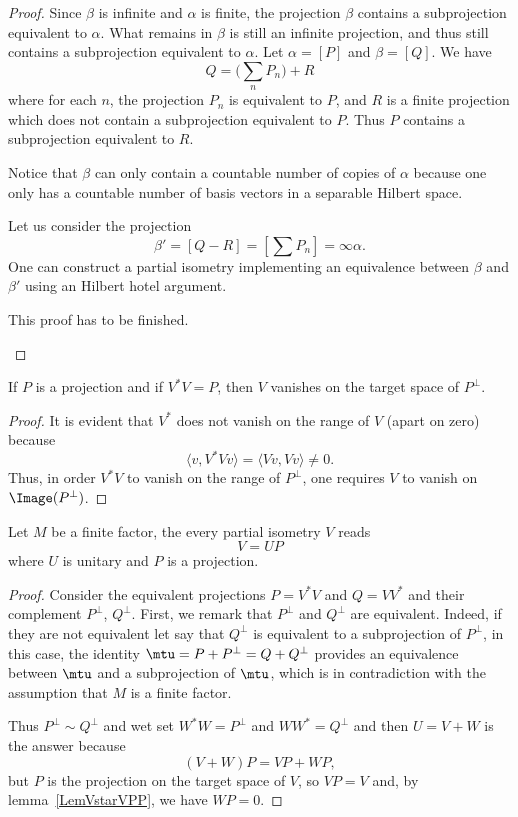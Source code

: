 \begin{proof}
Since $\beta$ is infinite and $\alpha$ is finite, the projection $\beta$ contains a subprojection equivalent to $\alpha$. What remains in $\beta$ is still an infinite projection, and thus still contains a subprojection equivalent to $\alpha$. Let $\alpha=[P]$ and $\beta=[Q]$. We have
\[
  Q=\big( \sum_nP_n \big)+R
\]
where for each $n$, the projection $P_n$ is equivalent to $P$, and $R$ is a finite projection which does not contain a subprojection equivalent to $P$. Thus $P$ contains a subprojection equivalent to $R$.

Notice that $\beta$ can only contain a countable number of copies of $\alpha$ because one only has a countable number of basis vectors in a separable Hilbert space.

Let us consider the projection
\begin{equation}
	\beta'=[Q-R]=[\sum P_n]=\infty\alpha.
\end{equation}
One can construct a partial isometry implementing an equivalence between $\beta$ and $\beta'$ using an Hilbert hotel argument.
\begin{probleme}
This proof has to be finished.
\end{probleme}
\end{proof}

\begin{lemma}	\label{LemVstarVPP}
If $P$ is a projection and if $V^*V=P$, then $V$ vanishes on the target space of $P^{\perp}$.
\end{lemma}

\begin{proof}
It is evident that $V^*$ does not vanish on the range of $V$ (apart on zero) because
\[
  \langle v, V^*Vv\rangle =\langle Vv, Vv\rangle \neq 0.
\]
Thus, in order $V^*V$ to vanish on the range of $P^{\perp}$, one requires $V$ to vanish on $\Image(P^{\perp})$.
\end{proof}

\begin{lemma}		\label{LemfinifactisemVUP}
Let $M$ be a finite factor, the every partial isometry $V$ reads
\begin{equation}
	V=UP
\end{equation}
where $U$ is unitary and $P$ is a projection.
\end{lemma}

\begin{proof}
Consider the equivalent projections $P=V^*V$ and $Q=VV^*$ and their complement $P^{\perp}$, $Q^{\perp}$. First, we remark that $P^{\perp}$ and $Q^{\perp}$ are equivalent. Indeed, if they are not equivalent let say that $Q^{\perp}$ is equivalent to a subprojection of $P^{\perp}$, in this case, the identity $\mtu=P+P^{\perp}=Q+Q^{\perp}$ provides an equivalence between $\mtu$ and a subprojection of $\mtu$, which is in contradiction with the assumption that $M$ is a finite factor.

Thus $P^{\perp}\sim Q^{\perp}$ and wet set $W^*W=P^{\perp}$ and $WW^*=Q^{\perp}$ and then $U=V+W$ is the answer because
\[
  (V+W)P=VP+WP,
\]
but $P$ is the projection on the target space of $V$, so $VP=V$ and, by lemma~\ref{LemVstarVPP}, we have $WP=0$.
\end{proof}


